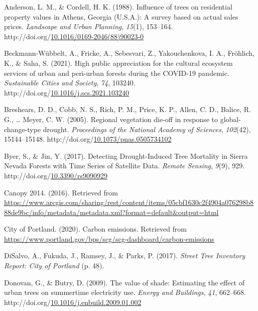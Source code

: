 \documentclass[12pt,twoside]{reedthesis}
\newlength{\cslhangindent}
\newenvironment{CSLReferences}[2] %
 {%
  \setlength{\parindent}{0pt}
  \ifodd #1 \everypar{\setlength{\hangindent}{\cslhangindent}}\ignorespaces\fi
  \ifnum #2 > 0
  \setlength{\parskip}{#2\baselineskip}
  \fi
 }%
 {}
\begin{document}
\hypertarget{refs}{}
\begin{CSLReferences}{1}{0}
\leavevmode{}%
Anderson, L. M., \& Cordell, H. K. (1988). Influence of trees on residential property values in Athens, Georgia (U.S.A.): A survey based on actual sales prices. \emph{Landscape and Urban Planning}, \emph{15}(1), 153--164. http://doi.org/\href{https://doi.org/10.1016/0169-2046(88)90023-0}{10.1016/0169-2046(88)90023-0}

\leavevmode{}%
Beckmann-Wübbelt, A., Fricke, A., Sebesvari, Z., Yakouchenkova, I. A., Fröhlich, K., \& Saha, S. (2021). High public appreciation for the cultural ecosystem services of urban and peri{\nobreakdash-}urban forests during the COVID-19 pandemic. \emph{Sustainable Cities and Society}, \emph{74}, 103240. http://doi.org/\href{https://doi.org/10.1016/j.scs.2021.103240}{10.1016/j.scs.2021.103240}

\leavevmode{}%
Breshears, D. D., Cobb, N. S., Rich, P. M., Price, K. P., Allen, C. D., Balice, R. G., \ldots{} Meyer, C. W. (2005). Regional vegetation die-off in response to global-change-type drought. \emph{Proceedings of the National Academy of Sciences}, \emph{102}(42), 15144--15148. http://doi.org/\href{https://doi.org/10.1073/pnas.0505734102}{10.1073/pnas.0505734102}

\leavevmode{}%
Byer, S., \& Jin, Y. (2017). Detecting Drought-Induced Tree Mortality in Sierra Nevada Forests with Time Series of Satellite Data. \emph{Remote Sensing}, \emph{9}(9), 929. http://doi.org/\href{https://doi.org/10.3390/rs9090929}{10.3390/rs9090929}

\leavevmode{}%
Canopy 2014. (2016). Retrieved from \url{https://www.arcgis.com/sharing/rest/content/items/05cbf1630c2f4904a076298b888de9bc/info/metadata/metadata.xml?format=default\&output=html}

\leavevmode{}%
City of Portland. (2020). Carbon emissions. Retrieved from \url{https://www.portland.gov/bps/scg/scg-dashboard/carbon-emissions}

\leavevmode{}%
DiSalvo, A., Fukuda, J., Ramsey, J., \& Parks, P. (2017). \emph{Street Tree Inventory Report: City of Portland} (p. 48).

\leavevmode{}%
Donovan, G., \& Butry, D. (2009). The value of shade: Estimating the effect of urban trees on summertime electricity use. \emph{Energy and Buildings}, \emph{41}, 662--668. http://doi.org/\href{https://doi.org/10.1016/j.enbuild.2009.01.002}{10.1016/j.enbuild.2009.01.002}


\end{CSLReferences}
\end{document}
